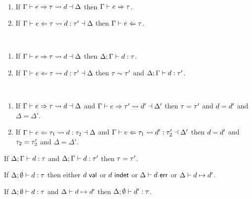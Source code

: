 \begin{theorem} ~
  \begin{enumerate}
    \item If $\Gamma \vdash e \Rightarrow \tau \leadsto d \dashv \Delta$ then $\Gamma \vdash e \Rightarrow \tau$.
    \item If $\Gamma \vdash e \Leftarrow \tau \leadsto d : \tau' \dashv \Delta$ then $\Gamma \vdash e \Leftarrow \tau$.
  \end{enumerate}
\end{theorem}

\begin{theorem} ~
  \begin{enumerate}
    \item If $\Gamma \vdash e \Rightarrow \tau \leadsto d \dashv \Delta$ then $\Delta; \Gamma \vdash d : \tau$.
    \item If $\Gamma \vdash e \Leftarrow \tau \leadsto d : \tau' \dashv \Delta$ then $\tau \sim \tau'$ and $\Delta; \Gamma \vdash d : \tau'$.
  \end{enumerate}
\end{theorem}

\begin{theorem} ~
  \begin{enumerate}
    \item If $\Gamma \vdash e \Rightarrow \tau \leadsto d \dashv \Delta$ and $\Gamma \vdash e \Rightarrow \tau' \leadsto d' \dashv \Delta'$ then $\tau=\tau'$ and $d=d'$ and $\Delta=\Delta'$.
    \item If $\Gamma \vdash e \Leftarrow \tau_1 \leadsto d : \tau_2 \dashv \Delta$ and $\Gamma \vdash e \Leftarrow \tau_1 \leadsto d' : \tau_2' \dashv \Delta'$ then $d=d'$ and $\tau_2=\tau_2'$ and $\Delta=\Delta'$.
  \end{enumerate}
\end{theorem}

\begin{theorem}
If $\Delta; \Gamma \vdash d : \tau$ and $\Delta; \Gamma \vdash d : \tau'$ then $\tau=\tau'$.
\end{theorem}

\begin{theorem}[Progress]
If $\Delta; \emptyset \vdash d : \tau$ then either $d~\mathsf{val}$ or $d~\mathsf{indet}$ or $\Delta \vdash d~\mathsf{err}$ or $\Delta \vdash d \mapsto d'$.
\end{theorem}

\begin{theorem}[Preservation]
  If $\Delta; \emptyset \vdash d : \tau$ and $\Delta \vdash d \mapsto d'$ then $\Delta; \emptyset \vdash d' : \tau$. 
\end{theorem}




